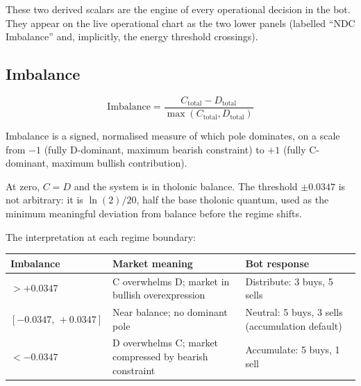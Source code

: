 \documentclass[12pt]{article}
\begin{document}
These two derived scalars are the engine of every operational decision
in the bot. They appear on the live operational chart as the two lower
panels (labelled ``NDC Imbalance'' and, implicitly, the energy threshold
crossings).

\subsection{Imbalance}\label{imbalance}

\[\text{Imbalance} = \frac{C_{\text{total}} - D_{\text{total}}}{\max(C_{\text{total}}, D_{\text{total}})}\]

Imbalance is a signed, normalised measure of which pole dominates, on a
scale from \(-1\) (fully D-dominant, maximum bearish constraint) to
\(+1\) (fully C-dominant, maximum bullish contribution).

At zero, \(C = D\) and the system is in tholonic balance. The threshold
\(\pm 0.0347\) is not arbitrary: it is \(\ln(2)/20\), half the base
tholonic quantum, used as the minimum meaningful deviation from balance
before the regime shifts.

The interpretation at each regime boundary:

\begin{longtable}[]{@{}
  >{\raggedright\arraybackslash}p{}
  >{\raggedright\arraybackslash}p{}
  >{\raggedright\arraybackslash}p{}@{}}
\toprule\noalign{}
\begin{minipage}[b]{\linewidth}\raggedright
Imbalance
\end{minipage} & \begin{minipage}[b]{\linewidth}\raggedright
Market meaning
\end{minipage} & \begin{minipage}[b]{\linewidth}\raggedright
Bot response
\end{minipage} \\
\midrule\noalign{}
\endhead
\bottomrule\noalign{}
\endlastfoot
\(> +0.0347\) & C overwhelms D; market in bullish overexpression &
Distribute: 3 buys, 5 sells \\
\([-0.0347,\, +0.0347]\) & Near balance; no dominant pole & Neutral: 5
buys, 3 sells (accumulation default) \\
\(< -0.0347\) & D overwhelms C; market compressed by bearish constraint
& Accumulate: 5 buys, 1 sell \\
\end{longtable}
\end{document}
